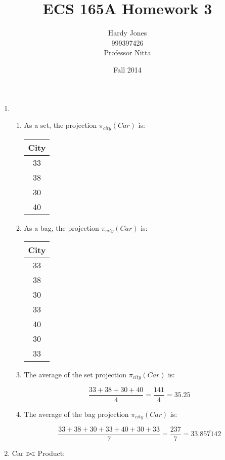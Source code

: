 \documentclass[12pt,letterpaper]{article}
\title{ECS 165A Homework 3\vspace{-2ex}}
\author{Hardy Jones\\
        999397426\\
        Professor Nitta\vspace{-2ex}}
\date{Fall 2014}
\def\ojoin{\setbox0=\hbox{$\bowtie$}%
  \rule[-.02ex]{.25em}{.4pt}\llap{\rule[\ht0]{.25em}{.4pt}}}
\def\fullouterjoin{\mathbin{\ojoin\mkern-5.8mu\bowtie\mkern-5.8mu\ojoin}}
\begin{document}
  \maketitle

  \begin{enumerate}
    \item

      \begin{enumerate}
        \item
          As a set, the projection $\pi_{city}(Car)$ is:

          \begin{tabular}{c}
            City \\
            \hline
            \hline
            33 \\
            38 \\
            30 \\
            40 \\
          \end{tabular}

        \item
          As a bag, the projection $\pi_{city}(Car)$ is:

          \begin{tabular}{c}
            City \\
            \hline
            \hline
            33 \\
            38 \\
            30 \\
            33 \\
            40 \\
            30 \\
            33 \\
          \end{tabular}

        \item
          The average of the set projection $\pi_{city}(Car)$ is:

          \[
            \frac{33 + 38 + 30 + 40}{4} = \frac{141}{4} = 35.25
          \]

        \item
          The average of the bag projection $\pi_{city}(Car)$ is:

          \[
            \frac{33 + 38 + 30 + 33 + 40 + 30 + 33}{7} = \frac{237}{7} = 33.\overline{857142}
          \]
      \end{enumerate}

    \item
      Car $\fullouterjoin$ Product:


\end{enumerate}
\end{document}
